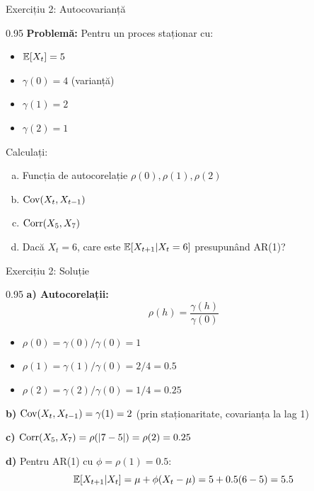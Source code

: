 \documentclass[9pt, aspectratio=169, t]{beamer}
\begin{document}
\begin{frame}{Exercițiu 2: Autocovarianță}
    \begin{cminipage}{0.95\textwidth}
    \textbf{Problemă:} Pentru un proces staționar cu:
    \begin{itemize}\setlength{\itemsep}{0pt}
        \item $\mathbb{E}[X_t] = 5$
        \item $\gamma(0) = 4$ (varianță)
        \item $\gamma(1) = 2$
        \item $\gamma(2) = 1$
    \end{itemize}

    \vspace{0.3cm}

    Calculați:
    \begin{enumerate}[a)]\setlength{\itemsep}{0pt}
        \item Funcția de autocorelație $\rho(0), \rho(1), \rho(2)$
        \item $\text{Cov}(X_t, X_{t-1})$
        \item $\text{Corr}(X_5, X_7)$
        \item Dacă $X_t = 6$, care este $\mathbb{E}[X_{t+1} | X_t = 6]$ presupunând AR(1)?
    \end{enumerate}
    \end{cminipage}
\end{frame}

\begin{frame}{Exercițiu 2: Soluție}
    \begin{cminipage}{0.95\textwidth}
    \textbf{a) Autocorelații:}
    \[
        \rho(h) = \frac{\gamma(h)}{\gamma(0)}
    \]
    \begin{itemize}\setlength{\itemsep}{0pt}
        \item $\rho(0) = \gamma(0)/\gamma(0) = 1$
        \item $\rho(1) = \gamma(1)/\gamma(0) = 2/4 = 0.5$
        \item $\rho(2) = \gamma(2)/\gamma(0) = 1/4 = 0.25$
    \end{itemize}

    \vspace{0.2cm}

    \textbf{b)} $\text{Cov}(X_t, X_{t-1}) = \gamma(1) = 2$ \quad (prin staționaritate, covarianța la lag 1)

    \vspace{0.2cm}

    \textbf{c)} $\text{Corr}(X_5, X_7) = \rho(|7-5|) = \rho(2) = 0.25$

    \vspace{0.2cm}

    \textbf{d)} Pentru AR(1) cu $\phi = \rho(1) = 0.5$:
    \[
        \mathbb{E}[X_{t+1} | X_t] = \mu + \phi(X_t - \mu) = 5 + 0.5(6-5) = 5.5
    \]
    \end{cminipage}
\end{frame}
\end{document}
